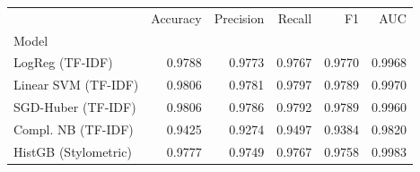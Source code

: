 \begin{tabular}{lrrrrr}
\toprule
 & Accuracy & Precision & Recall & F1 & AUC \\
Model &  &  &  &  &  \\
\midrule
LogReg (TF-IDF) & 0.9788 & 0.9773 & 0.9767 & 0.9770 & 0.9968 \\
Linear SVM (TF-IDF) & 0.9806 & 0.9781 & 0.9797 & 0.9789 & 0.9970 \\
SGD-Huber (TF-IDF) & 0.9806 & 0.9786 & 0.9792 & 0.9789 & 0.9960 \\
Compl. NB (TF-IDF) & 0.9425 & 0.9274 & 0.9497 & 0.9384 & 0.9820 \\
HistGB (Stylometric) & 0.9777 & 0.9749 & 0.9767 & 0.9758 & 0.9983 \\
\bottomrule
\end{tabular}
